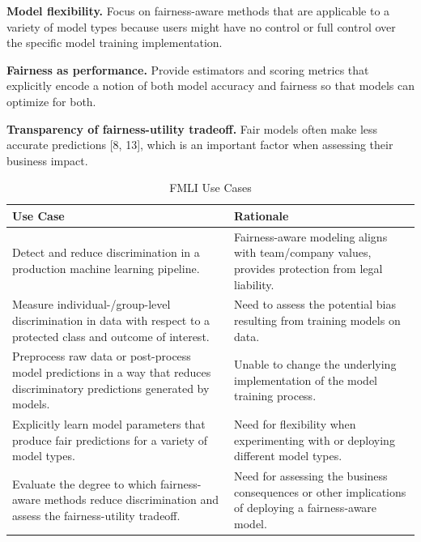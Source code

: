 \documentclass{acm_proc_article-sp}
\begin{document}
\begin{hangparas}{.15in}{1}
  \textbf{Model flexibility.} Focus on fairness-aware methods that are applicable
    to a variety of model types because users might have no control or full
    control over the specific model training implementation.
\end{hangparas}
\begin{hangparas}{.15in}{1}
  \textbf{Fairness as performance.} Provide estimators and scoring metrics that
    explicitly encode a notion of both model accuracy and fairness so that models
    can optimize for both.
\end{hangparas}
\begin{hangparas}{.15in}{1}
\textbf{Transparency of fairness-utility tradeoff.} Fair models often make less
  accurate predictions [8, 13], which is an important factor when assessing
  their business impact.
\end{hangparas}

\begin{table}
  \caption{FMLI Use Cases}
  \renewcommand{\arraystretch}{1.75}
  \small\noindent\begin{tabularx}{\linewidth}{X X}
    \textbf{Use Case} & \textbf{Rationale} \\
    \hline
    Detect and reduce discrimination in a production machine learning pipeline.
      & Fairness-aware modeling aligns with team/company values,
        provides protection from legal liability. \\
    Measure individual-/group-level discrimination in data with respect to a
    protected class and outcome of interest.
      & Need to assess the potential bias resulting from training models on
        data. \\
    Preprocess raw data or post-process model predictions in a way that reduces
    discriminatory predictions generated by models.
      & Unable to change the underlying implementation of the model training
        process. \\
    Explicitly learn model parameters that produce fair predictions for a variety
    of model types.
      & Need for flexibility when experimenting with or deploying different model
        types. \\
    Evaluate the degree to which fairness-aware methods reduce discrimination
    and assess the fairness-utility tradeoff.
      & Need for assessing the business consequences or other implications of
        deploying a fairness-aware model.
  \end{tabularx}
\end{table}
\end{document}
